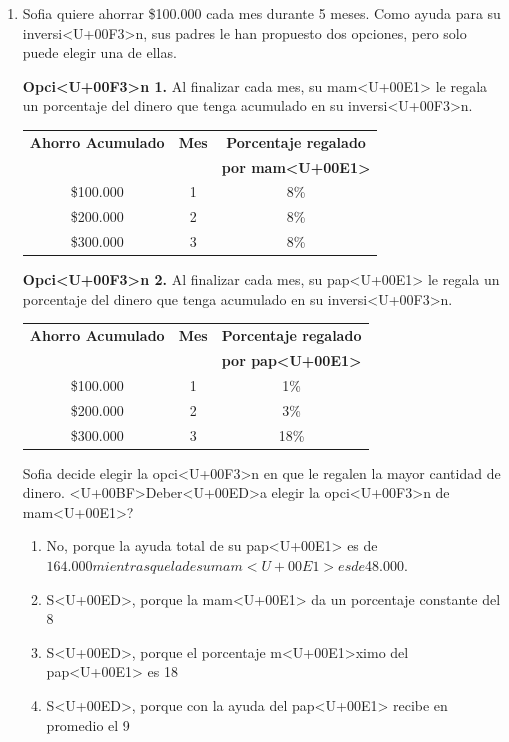 \documentclass[10pt,a4paper]{article}
\newenvironment{question}{\item}{}
\newenvironment{answerlist}{\renewcommand{\labelenumii}{(\alph{enumii})}\begin{enumerate}}{\end{enumerate}}
\begin{document}


\begin{enumerate}


\begin{question}

Sofia quiere ahorrar \$100.000 cada mes durante 5 meses. Como ayuda para su inversi<U+00F3>n, sus padres le han propuesto dos opciones, pero solo puede elegir una de ellas.

\textbf{Opci<U+00F3>n 1.} Al finalizar cada mes, su mam<U+00E1> le regala un porcentaje del dinero que tenga acumulado en su inversi<U+00F3>n.

\begin{tabular}{|c|c|c|}
\hline
\textbf{Ahorro Acumulado} & \textbf{Mes} & \textbf{Porcentaje regalado} \\
& & \textbf{por mam<U+00E1>} \\
\hline
\$100.000 & 1 & 8\% \\
\hline
\$200.000 & 2 & 8\% \\
\hline
\$300.000 & 3 & 8\% \\
\hline
\end{tabular}
\textbf{Opci<U+00F3>n 2.} Al finalizar cada mes, su pap<U+00E1> le regala un porcentaje del dinero que tenga acumulado en su inversi<U+00F3>n.

\begin{tabular}{|c|c|c|}
\hline
\textbf{Ahorro Acumulado} & \textbf{Mes} & \textbf{Porcentaje regalado} \\
& & \textbf{por pap<U+00E1>} \\
\hline
\$100.000 & 1 & 1\% \\
\hline
\$200.000 & 2 & 3\% \\
\hline
\$300.000 & 3 & 18\% \\
\hline
\end{tabular}
Sofia decide elegir la opci<U+00F3>n en que le regalen la mayor cantidad de dinero. <U+00BF>Deber<U+00ED>a elegir la opci<U+00F3>n de mam<U+00E1>?

\begin{answerlist}
  \item No, porque la ayuda total de su pap<U+00E1> es de $164.000 mientras que la de su mam<U+00E1> es de $48.000.
  \item S<U+00ED>, porque la mam<U+00E1> da un porcentaje constante del 8%
  \item S<U+00ED>, porque el porcentaje m<U+00E1>ximo del pap<U+00E1> es 18%
  \item S<U+00ED>, porque con la ayuda del pap<U+00E1> recibe en promedio el 9%
\end{answerlist}
\end{question}


\end{enumerate}
\end{document}
